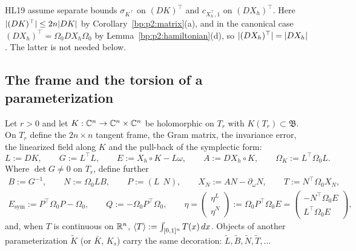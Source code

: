 \begin{remark}\label{bp:p2:transposes}
HL19 assume separate bounds $\sigma_{K^\top}$ on $(DK)^\top$ and $c_{X_h^\top,1}$ on $(DX_h)^\top$. Here
$\lvert (DK)^\top\rvert\le2n\lvert DK\rvert$ by Corollary~\ref{bp:p2:matrix}(a), and in the canonical case
$(DX_h)^\top=\Omega_0DX_h\Omega_0$ by Lemma~\ref{bp:p2:hamiltonian}(d), so $\lvert (DX_h)^\top\rvert=
\lvert DX_h\rvert$. The latter is not needed below.
\end{remark}

\subsection{The frame and the torsion of a parameterization}\label{bp:p2:sec-objects}

\begin{definition}\label{bp:p2:objects}
Let $r>0$ and let $K:\mathbb{C}^n\to\mathbb{C}^n\times\mathbb{C}^n$ be holomorphic on $T_r$ with $K(T_r)\subset\mathfrak B$.
On $T_r$ define the $2n\times n$ tangent frame, the Gram matrix, the invariance error, the linearized
field along $K$ and the pull-back of the symplectic form:
\[
L:=DK,\qquad G:=L^\top L,\qquad E:=X_h\circ K-L\omega,\qquad A:=DX_h\circ K,\qquad
\Omega_K:=L^\top\Omega_0L.
\]
Where $\det G\ne0$ on $T_r$, define further
\begin{gather*}
B:=G^{-1},\qquad N:=\Omega_0LB,\qquad P:=(L\ \ N),\qquad X_N:=AN-\partial_\omega N,\qquad
T:=N^\top\Omega_0X_N,\\
E_{\mathrm{sym}}:=P^\top\Omega_0P-\Omega_0,\qquad Q:=-\Omega_0P^\top\Omega_0,\qquad
\eta=\begin{pmatrix}\eta^L\\\eta^N\end{pmatrix}:=\Omega_0P^\top\Omega_0E
=\begin{pmatrix}-N^\top\Omega_0E\\ L^\top\Omega_0E\end{pmatrix},
\end{gather*}
and, when $T$ is continuous on $\mathbb{R}^n$, $\langle T\rangle:=\int_{[0,1]^n}T(x)\,dx$. Objects of another
parameterization $\tilde K$ (or $\bar K$, $K_s$) carry the same decoration: $\tilde L,\tilde B,\tilde
N,\tilde T,\dots$
\end{definition}

